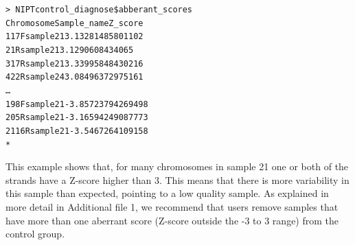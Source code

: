 \begin{alltt}
	\footnotesize 
\noindent\textgreater\ NIPTcontrol\_diagnose\$abberant\_scores \medskip\\
\indent Chromosome\hspace{0mm} Sample\_name \hspace{0mm} Z\_score \\
1 \baselineskip=4pt\hspace{1mm} 17F \hspace{11mm} sample21 \hspace{4mm} 3.13281485801102 \\
2 \baselineskip=4pt\hspace{1mm} 1R  \hspace{11mm} sample21 \hspace{4mm} 3.1290608434065 \\
3 \baselineskip=4pt\hspace{1mm} 17R \hspace{11mm} sample21 \hspace{4mm} 3.33995848430216 \\
4 \baselineskip=4pt\hspace{1mm} 22R \hspace{11mm} sample24 \hspace{4mm} 3.08496372975161 \\
… \\
19 \baselineskip=4pt\hspace{1mm}8F \hspace{13mm}  sample21 \hspace{4mm} -3.85723794269498 \\
20 \baselineskip=4pt\hspace{1mm}5R \hspace{13mm}  sample21 \hspace{4mm} -3.16594249087773 \\
21 \baselineskip=4pt\hspace{1mm}16R\hspace{13mm}  sample21 \hspace{4mm} -3.5467264109158 \\*
\end{alltt}



\noindent This example shows that, for many chromosomes in sample 21 one or both of the strands have a Z-score higher than 3. 
This means that there is more variability in this sample than expected, pointing to a low quality sample. 
As explained in more detail in Additional file 1, we recommend that users remove samples that have more than one aberrant score (Z-score outside the -3 to 3 range) from the control group.

